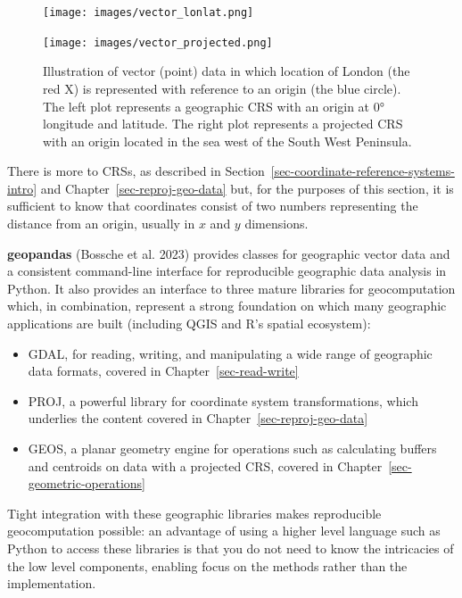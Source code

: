 \documentclass[
  letterpaper,
]{krantz}
\providecommand{\tightlist}{%
  \setlength{\itemsep}{0pt}\setlength{\parskip}{0pt}}\usepackage{longtable,booktabs,array}
\begin{document}
\begin{figure}

\begin{minipage}{0.50\linewidth}
\texttt{[image: images/vector\_lonlat.png]}\end{minipage}%
%
\begin{minipage}{0.50\linewidth}
\texttt{[image: images/vector\_projected.png]}\end{minipage}%

\caption{\label{fig-vector-london}Illustration of vector (point) data in
which location of London (the red X) is represented with reference to an
origin (the blue circle). The left plot represents a geographic CRS with
an origin at 0° longitude and latitude. The right plot represents a
projected CRS with an origin located in the sea west of the South West
Peninsula.}

\end{figure}%

There is more to CRSs, as described in
Section~\ref{sec-coordinate-reference-systems-intro} and
Chapter~\ref{sec-reproj-geo-data} but, for the purposes of this section,
it is sufficient to know that coordinates consist of two numbers
representing the distance from an origin, usually in \(x\) and \(y\)
dimensions.

\textbf{geopandas} (Bossche et al. 2023) provides classes for geographic
vector data and a consistent command-line interface for reproducible
geographic data analysis in Python. It also provides an interface to
three mature libraries for geocomputation which, in combination,
represent a strong foundation on which many geographic applications are
built (including QGIS and R's spatial ecosystem):

\begin{itemize}
\tightlist
\item
  GDAL, for reading, writing, and manipulating a wide range of
  geographic data formats, covered in Chapter~\ref{sec-read-write}
\item
  PROJ, a powerful library for coordinate system transformations, which
  underlies the content covered in Chapter~\ref{sec-reproj-geo-data}
\item
  GEOS, a planar geometry engine for operations such as calculating
  buffers and centroids on data with a projected CRS, covered in
  Chapter~\ref{sec-geometric-operations}
\end{itemize}

Tight integration with these geographic libraries makes reproducible
geocomputation possible: an advantage of using a higher level language
such as Python to access these libraries is that you do not need to know
the intricacies of the low level components, enabling focus on the
methods rather than the implementation.
\end{document}
